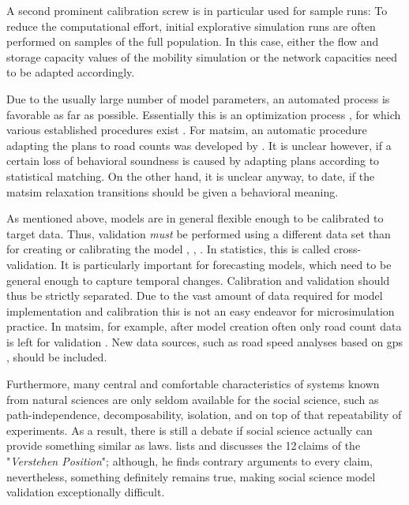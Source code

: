 A second prominent calibration screw is in particular used for sample runs: To reduce the computational effort, initial explorative simulation runs are often performed on samples of the full population. In this case, either the flow and storage capacity values of the mobility simulation or the network capacities need to be adapted accordingly. 

Due to the usually large number of model parameters, an automated process is favorable as far as possible. Essentially this is an optimization process \citep[][p.353]{HollanderLiu_Transportation_2007}, for which various established procedures exist \citep[e.g.,][p.41ff]{ZhangMa_ResRep_PATH_2008}. For \gls{matsim}, an automatic procedure adapting the plans to road counts was developed by \citet[][]{floetteroed-2010e}. It is unclear however, if a certain loss of behavioral soundness is caused by adapting plans according to statistical matching. On the other hand, it is unclear anyway, to date, if the \gls{matsim} relaxation transitions should be given a behavioral meaning.


As mentioned above, models are in general flexible enough to be calibrated to target data. Thus, validation \emph{must} be performed using a different data set than for creating or calibrating the model \citep[][p.1]{CambridgeSystematics_manual_2008}, \citep[][p.56]{CFD_TRB_2007}, \citep[][p.18]{OrtuzarWillumsen_2001}. In statistics, this is called cross-validation. It is particularly important for forecasting models, which need to be general enough to capture temporal changes. Calibration and validation should thus be strictly separated. Due to the vast amount of data required for model implementation and calibration this is not an easy endeavor for \gls{microsimulation} practice. In \gls{matsim}, for example, after model creation often only road count data is left for validation \citep[][]{HorniEtAl_STRC_2009}. New data sources, such as road speed analyses based on \gls{gps} \citep[][]{HackneyEtAl_JGS_2007}, should be included.

Furthermore, many central and comfortable characteristics of systems known from natural sciences are only seldom available for the social science, such as path-independence, decomposability, isolation, and on top of that repeatability of experiments. As a result, there is still a debate if social science actually can provide something similar as laws. \citet[][p.107ff]{Abel_1976} lists and discusses the 12\,claims of the "\emph{Verstehen Position}"; although, he finds contrary arguments to every claim, nevertheless, something definitely remains true, making social science model validation exceptionally difficult. 

